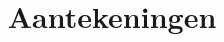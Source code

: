 \documentclass{tudelft-report}
\begin{document}
\frontmatter

\title[TW2215TI Kansrekening en Statistiek]{Aantekeningen}
\author{}
\makecover



%

\tableofcontents

\mainmatter



\appendix

%

%

\end{document}
